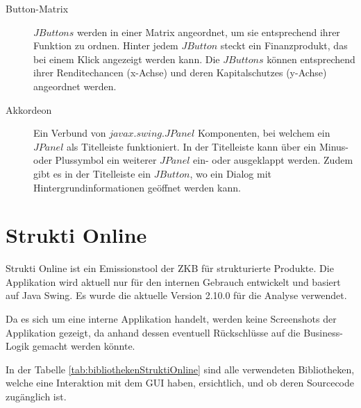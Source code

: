   \begin{description}
    \item[Button-Matrix]
    \(JButtons\) werden in einer Matrix angeordnet, um sie entsprechend ihrer
    Funktion zu ordnen. Hinter jedem \(JButton\) steckt ein Finanzprodukt, das
    bei einem Klick angezeigt werden kann. Die \(JButtons\) können entsprechend
    ihrer Renditechancen (x-Achse) und deren Kapitalschutzes (y-Achse)
    angeordnet werden.
    \item[Akkordeon]
    Ein Verbund von \(javax.swing.JPanel\) Komponenten, bei welchem ein
    \(JPanel\) als Titelleiste funktioniert. In der Titelleiste kann über ein
    Minus- oder Plussymbol ein weiterer \(JPanel\) ein- oder ausgeklappt werden.
    Zudem gibt es in der Titelleiste ein \(JButton\), wo ein Dialog mit
    Hintergrundinformationen geöffnet werden kann.
  \end{description}
  
  \section{Strukti Online}
  
  Strukti Online ist ein Emissionstool der \ac{ZKB} für strukturierte Produkte.
  Die Applikation wird aktuell nur für den internen Gebrauch entwickelt und
  basiert auf Java Swing. Es wurde die aktuelle Version 2.10.0 für die Analyse
  verwendet.
  
  Da es sich um eine interne Applikation handelt, werden keine Screenshots
  der Applikation gezeigt, da anhand dessen eventuell Rückschlüsse auf die
  Business-Logik gemacht werden könnte.
  
  In der Tabelle \ref{tab:bibliothekenStruktiOnline} sind alle verwendeten
  Bibliotheken, welche eine Interaktion mit dem \ac{GUI} haben, ersichtlich,
  und ob deren Sourcecode zugänglich ist.
  
